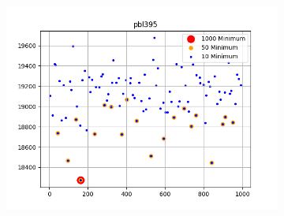 \documentclass{article}
\def\v{0.4}
\begin{document}
\begin{figure}[h!]
\begin{subfigure}[b]{\v\linewidth}
	\end{subfigure}
	\begin{subfigure}[b]{\v\linewidth}
		\includegraphics[width=\linewidth]{graphs/min_pbl395.png}
	\end{subfigure}
\end{figure}
\end{document}
